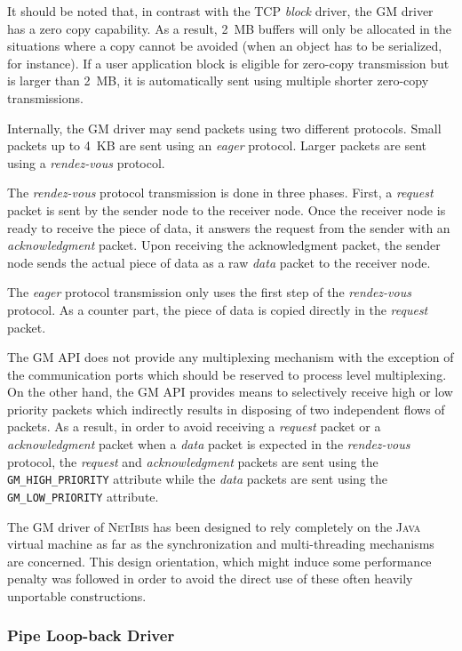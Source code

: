 \documentclass[11pt]{book}
\def\NetIbis{\textsc{NetIbis}\xspace}
\begin{document}
It should be noted that, in contrast with the TCP \emph{block} driver,
the GM driver has a zero copy capability. As a result, 2~MB buffers
will only be allocated in the situations where a copy cannot be
avoided (when an object has to be serialized, for instance). If a user
application block is eligible for zero-copy transmission but is larger
than 2~MB, it is automatically sent using multiple shorter zero-copy
transmissions.

Internally, the GM driver may send packets using two different
protocols. Small packets up to 4~KB are sent using an \emph{eager}
protocol. Larger packets are sent using a \emph{rendez-vous} protocol.

The \emph{rendez-vous} protocol transmission is done in three phases.
First, a \emph{request} packet is sent by the sender node to the
receiver node. Once the receiver node is ready to receive the piece of
data, it answers the request from the sender with an
\emph{acknowledgment} packet. Upon receiving the acknowledgment
packet, the sender node sends the actual piece of data as a raw
\emph{data} packet to the receiver node.

The \emph{eager} protocol transmission only uses the first step of the
\emph{rendez-vous} protocol. As a counter part, the piece of data is
copied directly in the \emph{request} packet.

The GM API does not provide any multiplexing mechanism with the
exception of the communication ports which should be reserved to
process level multiplexing. On the other hand, the GM API provides
means to selectively receive high or low priority packets which
indirectly results in disposing of two independent flows of packets.
As a result, in order to avoid receiving a \emph{request} packet or a
\emph{acknowledgment} packet when a \emph{data} packet is expected in
the \emph{rendez-vous} protocol, the \emph{request} and
\emph{acknowledgment} packets are sent using the
\texttt{GM\_HIGH\_PRIORITY} attribute while the \emph{data} packets are
sent using the \texttt{GM\_LOW\_PRIORITY} attribute.

The GM driver of \NetIbis has been designed to rely completely on the
\textsc{Java} virtual machine as far as the synchronization and
multi-threading mechanisms are concerned. This design orientation,
which might induce some performance penalty was followed in order to
avoid the direct use of these often heavily unportable constructions.

%
\subsubsection{Pipe Loop-back Driver}
\label{sec:pipe-loopback-driver}
\end{document}

